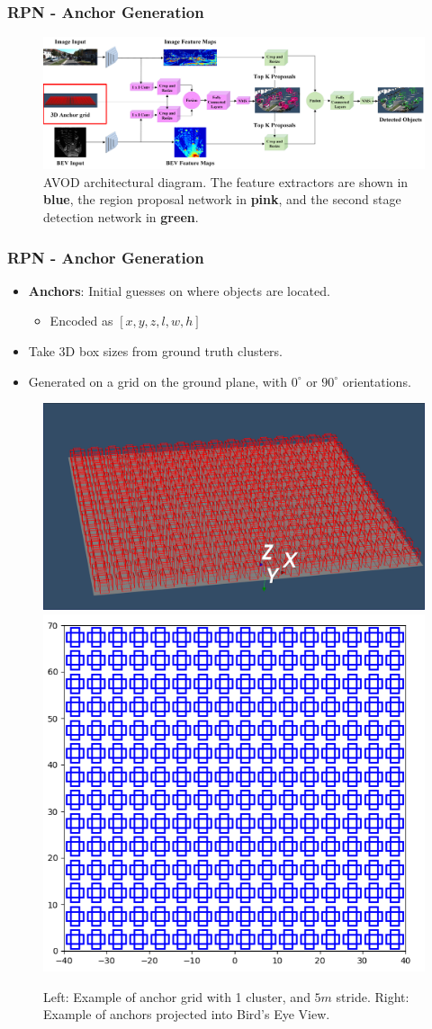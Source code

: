 \documentclass[10pt,fleqn,unknownkeysallowed]{beamer}
\begin{document}
\begin{frame}
	\frametitle{RPN - Anchor Generation}
	\begin{figure}
		\begin{center}
			\includegraphics[width=115mm]{images/Meta-Architecture_2}
			\caption{AVOD architectural diagram. The feature extractors are shown in \textbf{blue}, the region proposal network in \textbf{pink}, and the second stage detection network in \textbf{green}.}
		\end{center}
	\end{figure}
\end{frame}	

\begin{frame}
	\frametitle{RPN - Anchor Generation}
	\begin{itemize}
		\item{\textbf{Anchors}: Initial guesses on where objects are located.}
		\begin{itemize}
			\item{Encoded as $[x, y, z, l, w, h]$}
		\end{itemize}
		\item{Take 3D box sizes from ground truth clusters.}
		\item{Generated on a grid on the ground plane, with $0^\circ$ or $90^\circ$ orientations.}
	\end{itemize}
	\begin{figure}[H]
		\begin{center}
			\includegraphics[width=0.6\linewidth]{images/anchor_grid}
			\includegraphics[width=0.4\linewidth]{images/projected_anchors_in_bev}
		\end{center}
		\caption{Left: Example of anchor grid with 1 cluster, and $5m$ stride. Right: Example of anchors projected into Bird's Eye View.}
	\end{figure}
\end{frame}
\end{document}
